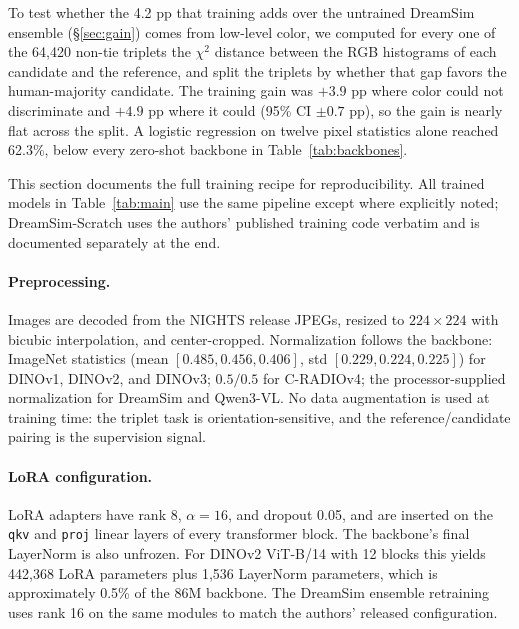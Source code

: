 \vspace{1em}

To test whether the 4.2 pp that training adds over the untrained DreamSim ensemble (\S\ref{sec:gain}) comes from low-level color, we computed for every one of the 64{,}420 non-tie triplets the $\chi^2$ distance between the RGB histograms of each candidate and the reference, and split the triplets by whether that gap favors the human-majority candidate. The training gain was $+3.9$ pp where color could not discriminate and $+4.9$ pp where it could (95\% CI $\pm 0.7$ pp), so the gain is nearly flat across the split. A logistic regression on twelve pixel statistics alone reached 62.3\%, below every zero-shot backbone in Table~\ref{tab:backbones}.

\clearpage
{}
\vspace{1em}

This section documents the full training recipe for reproducibility. All trained models in Table~\ref{tab:main} use the same pipeline except where explicitly noted; DreamSim-Scratch uses the authors' published training code verbatim and is documented separately at the end.

\paragraph{Preprocessing.} Images are decoded from the NIGHTS release JPEGs, resized to $224\times 224$ with bicubic interpolation, and center-cropped. Normalization follows the backbone: ImageNet statistics (mean $[0.485, 0.456, 0.406]$, std $[0.229, 0.224, 0.225]$) for DINOv1, DINOv2, and DINOv3; $0.5/0.5$ for C-RADIOv4; the processor-supplied normalization for DreamSim and Qwen3-VL. No data augmentation is used at training time: the triplet task is orientation-sensitive, and the reference/candidate pairing is the supervision signal.

\paragraph{LoRA configuration.} LoRA adapters have rank 8, $\alpha = 16$, and dropout 0.05, and are inserted on the \texttt{qkv} and \texttt{proj} linear layers of every transformer block. The backbone's final LayerNorm is also unfrozen. For DINOv2 ViT-B/14 with 12 blocks this yields 442{,}368 LoRA parameters plus 1{,}536 LayerNorm parameters, which is approximately 0.5\% of the 86M backbone. The DreamSim ensemble retraining uses rank 16 on the same modules to match the authors' released configuration.

